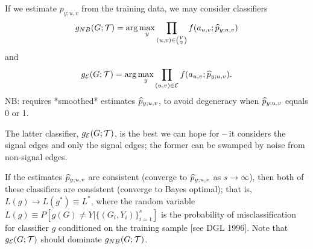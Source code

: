 If we estimate $p_{y;u,v}$ from the training data,
we may consider classifiers
\begin{eqnarray}
g_{NB}(G;\mathcal{T}) = \arg\max_y \prod_{(u,v) \in {V \choose 2}} f(a_{u,v};\widehat{p}_{y;u,v})
\end{eqnarray}
and
\begin{eqnarray}
g_{\mathcal{E}}(G;\mathcal{T}) = \arg\max_y \prod_{(u,v) \in \mathcal{E}} f(a_{u,v};\widehat{p}_{y;u,v}).
\end{eqnarray}
NB: requires *smoothed* estimates $\widehat{p}_{y;u,v}$,
to avoid degeneracy when $\widehat{p}_{y;u,v}$ equals 0 or 1.

The latter classifier, $g_{\mathcal{E}}(G;\mathcal{T})$,
is the best we can hope for -- it considers the signal edges and only the signal edges;
the former can be swamped by noise from non-signal edges.

If the estimates $\widehat{p}_{y;u,v}$ are consistent (converge to $\widehat{p}_{y;u,v}$ as $s \rightarrow \infty$),
then both of these classifiers are consistent (converge to Bayes optimal);
that is, $L(g) \rightarrow L(g^*) \equiv L^*$,
where the random variable $L(g) \equiv P[g(G) \neq Y| \{(G_i,Y_i)\}_{i=1}^s]$
is the probability of misclassification for classifier $g$
conditioned on the training sample [see DGL 1996].
Note that $g_{\mathcal{E}}(G;\mathcal{T})$ should dominate $g_{NB}(G;\mathcal{T})$.



\clearpage


%

%



